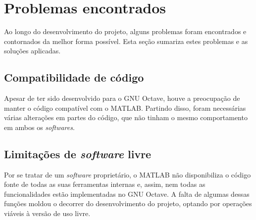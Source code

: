 \section{Problemas encontrados}

Ao longo do desenvolvimento do projeto, alguns problemas foram encontrados e contornados da melhor forma possível.
Esta seção sumariza estes problemas e as soluções aplicadas.

\subsection{Compatibilidade de código}

Apesar de ter sido desenvolvido para o GNU Octave, houve a preocupação de manter o código compatível com o MATLAB.
Partindo disso, foram necessárias várias alterações em partes do código, que não tinham o mesmo comportamento em ambos os \textit{softwares}.

\subsection{Limitações de \textit{software} livre}

Por se tratar de um \textit{software} proprietário, o MATLAB não disponibiliza o código fonte de todas as suas ferramentas internas e, assim, nem todas as funcionalidades estão implementadas no GNU Octave.
A falta de algumas dessas funções moldou o decorrer do desenvolvimento do projeto, optando por operações viáveis à versão de uso livre.


